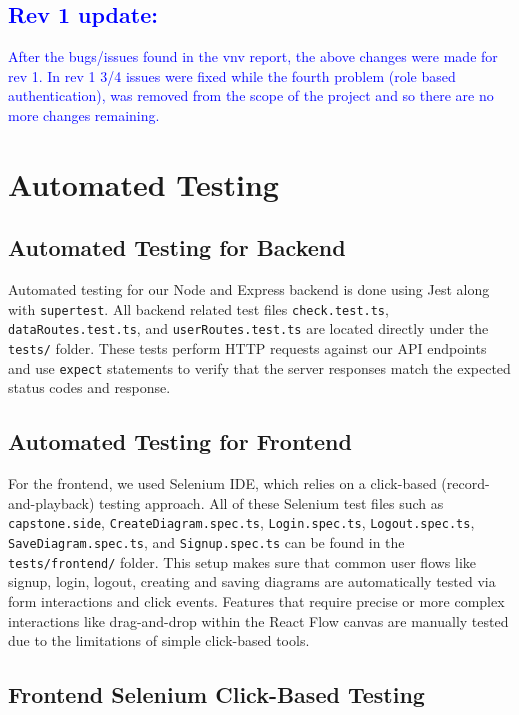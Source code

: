 \documentclass[12pt, titlepage]{article}
\begin{document}
\textcolor{blue}{\subsection{Rev 1 update:} After the bugs/issues found in the vnv report, the above changes were made for rev 1. In rev 1 3/4 issues were fixed while the fourth problem (role based authentication), was removed from the scope of the project and so there are no more changes remaining.}


\section{Automated Testing}

\subsection{Automated Testing for Backend}

Automated testing for our Node and Express backend is done using Jest along with \texttt{supertest}. All backend related test files \texttt{check.test.ts}, \texttt{dataRoutes.test.ts}, and \texttt{userRoutes.test.ts} are located directly under the \texttt{tests/} folder. These tests perform HTTP requests against our API endpoints and use \texttt{expect} statements to verify that the server responses match the expected status codes and response.

\subsection{Automated Testing for Frontend}

For the frontend, we used Selenium IDE, which relies on a click-based (record-and-playback) testing approach. All of these Selenium test files such as \texttt{capstone.side}, \texttt{CreateDiagram.spec.ts}, \texttt{Login.spec.ts}, \texttt{Logout.spec.ts}, \texttt{SaveDiagram.spec.ts}, and \texttt{Signup.spec.ts} can be found in the \texttt{tests/frontend/} folder. This setup makes sure that common user flows like signup, login, logout, creating and saving diagrams are automatically tested via form interactions and click events. Features that require precise or more complex interactions like drag-and-drop within the React Flow canvas are manually tested due to the limitations of simple click-based tools.
		
\subsection{Frontend Selenium Click-Based Testing}
\end{document}
